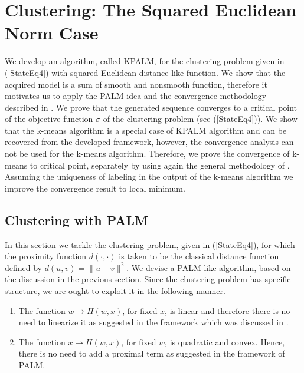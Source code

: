  \chapter{Clustering: The Squared Euclidean Norm Case} \label{Chptr3}

\noindent \noindent \hrulefill

We develop an algorithm, called KPALM, for the clustering problem given in (\ref{StateEq4}) with squared Euclidean distance-like function. We show that the acquired model is a sum of smooth and nonsmooth function, therefore it motivates us to apply the PALM idea and the convergence methodology described in . We prove that the generated sequence converges to a critical point of the objective function $\sigma$ of the clustering problem (see (\ref{StateEq4})). We show that the k-means algorithm is a special case of KPALM algorithm and can be recovered from the developed framework, however, the convergence analysis can not be used for the k-means algorithm. Therefore, we prove the convergence of k-means to critical point, separately by using again the general methodology of . Assuming the uniqueness of labeling in the output of the k-means algorithm we improve the convergence result to local minimum.

\noindent \noindent \hrulefill

\section{Clustering with PALM}\label{State_Clustering_SqNorm}

In this section we tackle the clustering problem, given in (\ref{StateEq4}), for which the proximity function $d(\cdot,\cdot)$ is taken to be the classical distance function defined by $d(u,v) = \|u-v\|^2$. We devise a PALM-like algorithm, based on the discussion in the previous section.
Since the clustering problem has specific structure, we are ought to exploit it in the following manner.
\begin{enumerate}[(1)]
	\item The function $w \mapsto H(w,x)$, for fixed $x$, is linear and therefore there is no need to linearize it as suggested in the framework which was discussed in .
	\item The function $x \mapsto H(w,x)$, for fixed $w$, is quadratic and convex. Hence, there is no need to add a proximal term as suggested in the framework of PALM.
\end{enumerate}

